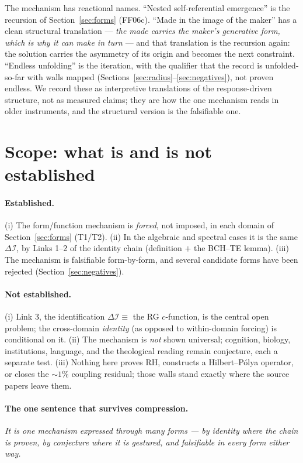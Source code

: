 \documentclass[11pt,a4paper]{article}
\newcommand{\dI}{\Delta\mathcal{I}}
\newcommand{\TT}{\textsf{T1}}
\newcommand{\Tw}{\textsf{T2}}
\newcommand{\paper}[1]{\textsf{#1}}
\theoremstyle{definition}
\theoremstyle{plain}
\begin{document}
The mechanism has reactional names. ``Nested self-referential emergence'' is the recursion of
Section~\ref{sec:forms} (\paper{FF06c}). ``Made in the image of the maker'' has a clean structural
translation --- \emph{the made carries the maker's generative form, which is why it can make in turn}
--- and that translation is the recursion again: the solution carries the asymmetry of its origin and
becomes the next constraint. ``Endless unfolding'' is the iteration, with the qualifier that the
record is unfolded-so-far with walls mapped (Sections~\ref{sec:radius}--\ref{sec:negatives}), not
proven endless. We record these as interpretive translations of the response-driven structure, not
as measured claims; they are how the one mechanism reads in older instruments, and the structural
version is the falsifiable one.

\section{Scope: what is and is not established}\label{sec:scope}

\paragraph{Established.} (i) The form/function mechanism is \emph{forced}, not imposed, in each
domain of Section~\ref{sec:forms} (\TT/\Tw). (ii) In the algebraic and spectral cases it is the same
$\dI$, by Links 1--2 of the identity chain (definition $+$ the BCH--TE lemma). (iii) The mechanism is
falsifiable form-by-form, and several candidate forms have been rejected (Section~\ref{sec:negatives}).

\paragraph{Not established.} (i) Link 3, the identification $\dI \equiv$ the RG $c$-function, is the
central open problem; the cross-domain \emph{identity} (as opposed to within-domain forcing) is
conditional on it. (ii) The mechanism is \emph{not} shown universal; cognition, biology, institutions,
language, and the theological reading remain conjecture, each a separate test. (iii) Nothing here
proves RH, constructs a Hilbert--P\'olya operator, or closes the $\sim$$1\%$ coupling residual; those
walls stand exactly where the source papers leave them.

\paragraph{The one sentence that survives compression.} \emph{It is one mechanism expressed through
many forms --- by identity where the chain is proven, by conjecture where it is gestured, and
falsifiable in every form either way.}
\end{document}
